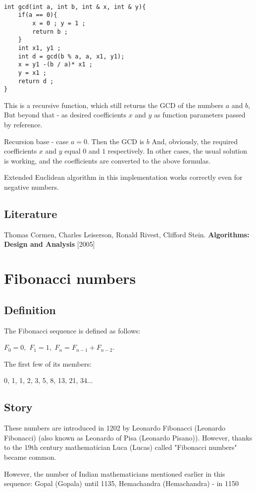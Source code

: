 \begin{verbatim}

int gcd(int a, int b, int & x, int & y){
    if(a == 0){
        x = 0 ; y = 1 ;
        return b ;
    }
    int x1, y1 ;
    int d = gcd(b % a, a, x1, y1);
    x = y1 -(b / a)* x1 ;
    y = x1 ;
    return d ;
} 
\end{verbatim}
This is a recursive function, which still returns the GCD of the numbers $a$ and $b$, But beyond that - as desired coefficients $x$ and $y$ as function parameters passed by reference.

Recursion base - case $a = 0$. Then the GCD is $b$ And, obviously, the required coefficients $x$ and $y$ equal $0$ and $1$ respectively. In other cases, the usual solution is working, and the coefficients are converted to the above formulas.

Extended Euclidean algorithm in this implementation works correctly even for negative numbers.

\subsection{ Literature }

Thomas Cormen, Charles Leiserson, Ronald Rivest, Clifford Stein. \textbf{Algorithms: Design and Analysis} [2005]
\section{ Fibonacci numbers }
\subsection{ Definition }

The Fibonacci sequence is defined as follows:

$F_0 = 0,$
$F_1 = 1,$
$F_n = F_ {n-1} + F_ {n-2}.$

The first few of its members:

0, 1, 1, 2, 3, 5, 8, 13, 21, 34...

\subsection{ Story }

These numbers are introduced in 1202 by Leonardo Fibonacci (Leonardo Fibonacci) (also known as Leonardo of Pisa (Leonardo Pisano)). However, thanks to the 19th century mathematician Luca (Lucas) called "Fibonacci numbers" became common.

However, the number of Indian mathematicians mentioned earlier in this sequence: Gopal (Gopala) until 1135, Hemachandra (Hemachandra) - in 1150


